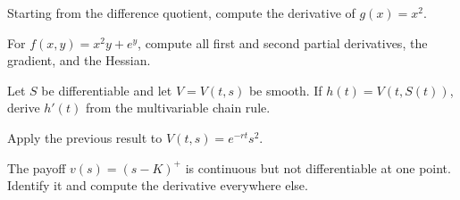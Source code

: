 \begin{exercise}
\begin{exparts}
  \item Starting from the difference quotient, compute the derivative of
  $g(x)=x^2$.
  \item For $f(x,y)=x^2y+e^y$, compute all first and second partial
  derivatives, the gradient, and the Hessian.
  \item Let $S$ be differentiable and let $V=V(t,s)$ be smooth. If
  $h(t)=V(t,S(t))$, derive $h'(t)$ from the multivariable chain rule.
  \item Apply the previous result to $V(t,s)=e^{-rt}s^2$.
  \item The payoff $v(s)=(s-K)^+$ is continuous but not differentiable at one
  point. Identify it and compute the derivative everywhere else.
\end{exparts}
\end{exercise}
